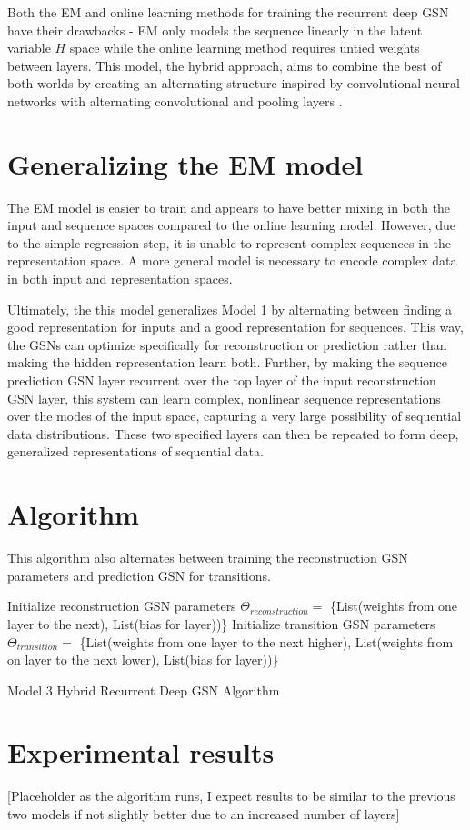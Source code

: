 Both the EM and online learning methods for training the recurrent deep GSN have their drawbacks - EM only models the sequence linearly in the latent variable \(H\) space while the online learning method requires untied weights between layers. This model, the hybrid approach, aims to combine the best of both worlds by creating an alternating structure inspired by convolutional neural networks with alternating convolutional and pooling layers \cite{lenet5}.

\section{Generalizing the EM model}
The EM model is easier to train and appears to have better mixing in both the input and sequence spaces compared to the online learning model. However, due to the simple regression step, it is unable to represent complex sequences in the representation space. A more general model is necessary to encode complex data in both input and representation spaces.

Ultimately, the this model generalizes Model 1 by alternating between finding a good representation for inputs and a good representation for sequences. This way, the GSNs can optimize specifically for reconstruction or prediction rather than making the hidden representation learn both. Further, by making the sequence prediction GSN layer recurrent over the top layer of the input reconstruction GSN layer, this system can learn complex, nonlinear sequence representations over the modes of the input space, capturing a very large possibility of sequential data distributions. These two specified layers can then be repeated to form deep, generalized representations of sequential data.


\section{Algorithm}
This algorithm also alternates between training the reconstruction GSN parameters and prediction GSN for transitions.
 \begin{algorithm}[h!]
	Initialize reconstruction GSN parameters \(\Theta_{reconstruction} = \) \{List(weights from one layer to the next), List(bias for layer))\}\;
	Initialize transition GSN parameters \(\Theta_{transition} = \) \{List(weights from one layer to the next higher), List(weights from on layer to the next lower), List(bias for layer))\}\;
	\caption{ Model 3 Hybrid  Recurrent Deep GSN Algorithm }
\end{algorithm}


\section{Experimental results}
[Placeholder as the algorithm runs, I expect results to be similar to the previous two models if not slightly better due to an increased number of layers]